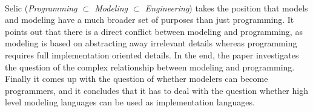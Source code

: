 

\ \hline \ %

Selic
\cite{isola-2016-selic}
({\em Programming $\subset$ Modeling $\subset$ Engineering})
takes the position that models and modeling have a much broader set of purposes than just programming. It points out that there is a direct conflict between modeling and programming, as modeling is based on abstracting away irrelevant details whereas programming requires full implementation oriented details. In the end, the paper investigates the question of the complex relationship between modeling and programming. Finally it comes up with the question of whether modelers can become programmers, and it concludes that it has to deal with the question whether high level modeling languages can be used as implementation languages.
 
\done{}